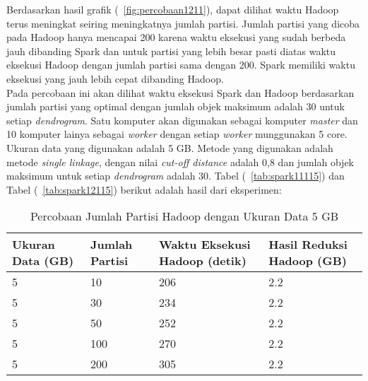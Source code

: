 Berdasarkan hasil grafik (~\ref{fig:percobaan1211}), dapat dilihat waktu Hadoop terus meningkat seiring meningkatnya jumlah partisi. Jumlah partisi yang dicoba pada Hadoop hanya mencapai 200 karena waktu eksekusi yang sudah berbeda jauh dibanding Spark dan untuk partisi yang lebih besar pasti diatas waktu eksekusi Hadoop dengan jumlah partisi sama dengan 200. Spark memiliki waktu eksekusi yang jauh lebih cepat dibanding Hadoop. \\
















Pada percobaan ini akan dilihat waktu eksekusi Spark dan Hadoop berdasarkan jumlah partisi yang optimal dengan jumlah objek maksimum adalah 30 untuk setiap \textit{dendrogram}. Satu komputer akan digunakan sebagai komputer \textit{master} dan 10 komputer lainya sebagai \textit{worker} dengan setiap \textit{worker} munggunakan 5 core. Ukuran data yang digunakan adalah 5 GB. Metode yang digunakan adalah metode \textit{single linkage}, dengan nilai \textit{cut-off distance} adalah 0,8 dan jumlah objek maksimum untuk setiap \textit{dendrogram} adalah 30. Tabel (~\ref{tab:spark11115}) dan Tabel (~\ref{tab:spark12115}) berikut adalah hasil dari eksperimen:





\begin{table}[H] 
	\centering 
	\caption{Percobaan Jumlah Partisi Hadoop dengan Ukuran Data 5 GB}
	\label{tab:spark1111}
	\begin{tabular}{|p{3cm}|p{3cm}|p{4cm}|p{4cm}|}
\hline
Ukuran Data (GB) & Jumlah Partisi &  Waktu Eksekusi Hadoop (detik) & Hasil Reduksi Hadoop (GB)\\
\hline
5 & 10 & 206  & 2.2  \\
\hline
5 & 30 & 234  & 2.2  \\
\hline
5 & 50 & 252  & 2.2   \\
\hline
5 & 100 & 270  & 2.2   \\
\hline
5 & 200 & 305  & 2.2   \\
\hline


\hline

	\end{tabular} 
\end{table}






